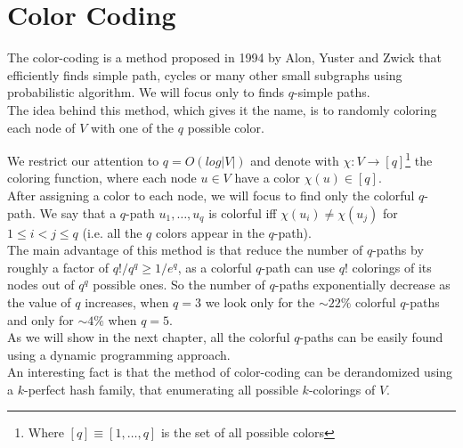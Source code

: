 \section{Color Coding}

The color-coding is a method proposed in 1994 by Alon, Yuster and Zwick that efficiently finds simple path, cycles or many other small subgraphs using probabilistic algorithm. We will focus only to finds $q$-simple paths.\\

The idea behind this method, which gives it the name, is to randomly coloring each node of $V$ with one of the $q$ possible color.

We restrict our attention to $q = O(log |V|)$ and denote with $\chi : V \rightarrow [q]$\footnote{Where $[q] \equiv [1, \ldots, q]$ is the set of all possible colors} the coloring function, where each node $u \in V$ have a color $\chi(u) \in [q]$.\\

After assigning a color to each node, we will focus to find only the colorful $q$-path. We say that a $q$-path $u_{1}, \ldots, u_{q}$ is colorful iff $\chi(u_{i}) \neq \chi(u_{j})$ for $1 \leq i < j \leq q$ (i.e. all the $q$ colors appear in the $q$-path).\\

The main advantage of this method is that reduce the number of $q$-paths by roughly a factor of $q! / q^{q} \geq 1/e^{q}$, as a colorful $q$-path can use $q!$ colorings of its nodes out of $q^{q}$ possible ones. So the number of $q$-paths exponentially decrease as the value of $q$ increases, when $q = 3$ we look only for the $\sim22\%$ colorful $q$-paths and only for $\sim4\%$ when $q = 5$.\\

As we will show in the next chapter, all the colorful $q$-paths can be easily found using a dynamic programming approach.\\

An interesting fact is that the method of color-coding can be derandomized using a $k$-perfect hash family, that enumerating all possible $k$-colorings of $V$.
	

